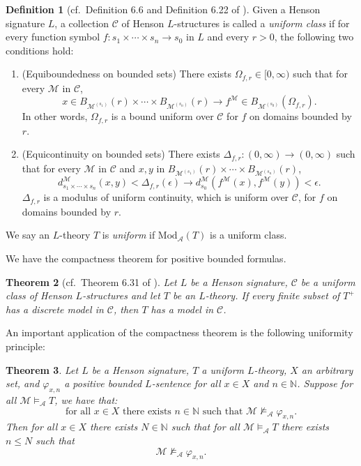 \documentclass[11pt]{amsart}
\newtheorem{theorem}{Theorem}[section]
\theoremstyle{definition}
\newtheorem{definition}[theorem]{Definition}
\theoremstyle{remark}
\def\NN{\mathbb{N}}
\begin{document}
\begin{definition}[cf.\ Definition 6.6 and Definition 6.22 of \cite{DI2017}]
Given a Henson signature $L$, a collection $\mathscr{C}$ of Henson $L$-structures is called a \emph{uniform class} if for every function symbol $f: s_1\times \cdots \times s_n\to s_0$ in $L$ and every $r>0$, the following two conditions hold:
\begin{enumerate}
    \item (Equiboundedness on bounded sets) There exists $\Omega_{f,r}\in [0,\infty)$ such that for every $\mathcal{M}$ in $\mathscr{C}$, 
    $$x\in B_{\mathcal{M}^{(s_1)}}(r)\times \cdots \times B_{\mathcal{M}^{(s_n)}}(r)\to f^{\mathcal{M}}\in  B_{\mathcal{M}^{(s_0)}}(\Omega_{f,r}) .$$ 
    In other words, $\Omega_{f,r}$ is a bound uniform over $\mathscr{C}$ for $f$ on domains bounded by $r$. 
    \item (Equicontinuity on bounded sets) There exists $\Delta_{f,r}:(0,\infty)\to (0,\infty)$ such that for every $\mathcal{M}$ in $\mathscr{C}$ and $x,y$ in $B_{\mathcal{M}^{(s_1)}}(r)\times \cdots \times B_{\mathcal{M}^{(s_n)}}(r)$, 
    $$d_{s_1\times\cdots \times s_n}^{\mathcal{M}}(x,y)<\Delta_{f,r}(\epsilon)\to d_{s_0}^{\mathcal{M}}(f^{\mathcal{M}}(x),f^{\mathcal{M}}(y))<\epsilon.$$
    $\Delta_{f,r}$ is a modulus of uniform continuity, which is uniform over $\mathscr{C}$, for $f$ on domains bounded by $r$. 
\end{enumerate}
We say an $L$-theory $T$ is \emph{uniform} if $\mathrm{Mod}_{\mathcal{A}}(T)$ is a uniform class.
\end{definition}
We have the compactness theorem for positive bounded formulas.
\begin{theorem}[cf.\ Theorem 6.31 of \cite{DI2017}]
\label{thrm:compactness}
    Let $L$ be a Henson signature, $\mathscr{C}$ be a uniform class of  Henson $L$-structures and let $T$ be an $L$-theory. If every finite subset of $T^+$ has a discrete model in $\mathscr{C}$, then $T$ has a model in $\mathscr{C}$.
\end{theorem}
An important application of the compactness theorem is the following uniformity principle: 
\begin{theorem}
\label{thrm:main:model:unif}
  Let $L$ be a Henson signature, $T$ a uniform $L$-theory, $X$ an arbitrary set, and $\varphi_{x,n}$ a positive bounded $L$-sentence for all $x \in X$ and $n \in \NN$. Suppose for all $\mathcal{M}\models_{\mathcal{A}}T$, we have that: 
  \[
  \mbox{for all } x \in X \mbox{ there exists } n \in \NN \mbox{ such that }
    \mathcal{M}\nvDash_{\mathcal{A}} \varphi_{x,n}.
  \]
Then for all $x \in X$ there exists $N \in \NN$ such that for all $\mathcal{M}\models_{\mathcal{A}}T$ there exists $n \le N$ such that  
\[
\mathcal{M} \nvDash_{\mathcal{A}} \varphi_{x,n}.
\]
\end{theorem}
\end{document}
